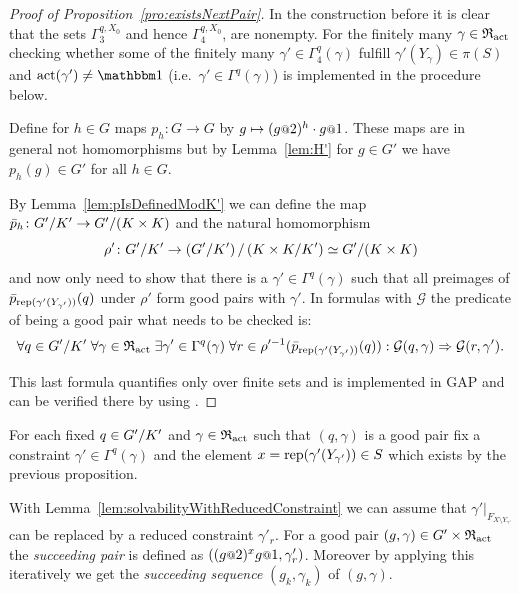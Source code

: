 \documentclass[a4paper,11pt]{amsart}
\begin{document}
\begin{proof}[Proof of Proposition~\ref{pro:existsNextPair}]
 In the construction before it is clear that the sets $\Gamma_3^{q,X_0}$ and hence $\Gamma_4^{q,X_0}$,
 are nonempty. For the finitely many $\gamma\in \mathfrak{R}_{\operatorname{act}}$ checking whether some of the finitely many 
 $\gamma'\in\Gamma_4^{q}(\gamma)$ fulfill 
 $\gamma'(Y_\gamma) \in \pi(S)$ and $\act(\gamma')\neq\id$ 
 (i.e.\ $\gamma' \in\Gamma^{q}(\gamma)$) is implemented in the procedure below.
 
 
  Define for $h\in G$ maps $p_h\colon G\to G$ by 
  $g\mapsto (g\at{2})^{h}\cdot g\at{1}$. These maps are in general not
   homomorphisms but   %
  by Lemma~\ref{lem:H'} for $g\in G'$ we have $p_h(g)\in G'$ for all $h\in G$. 
 
  By Lemma~\ref{lem:pIsDefinedModK'} we can define the map $\bar p_h\colon {G'/K'} \to {G'/(K\times K)}$
 and the natural homomorphism \[\rho'\colon {G'/K'} \to {\left({G'/K'}\right)/\left({K\times K/K'}\right)} \simeq {G'/(K\times K)} \]
 and now only need to show that there is a $\gamma'\in\Gamma^q(\gamma)$ such that all preimages of $\bar p_{\operatorname{rep}(\gamma'(Y_{\gamma'}))}(q)$ under $\rho'$ 
 form good pairs with $\gamma'$. In formulas with $\mathcal{G}$ the predicate of being a good pair what needs to be checked is: 
 \[\forall q\in{G'/K'}\;
      \forall \gamma\in\mathfrak{R}_{\operatorname{act}} \;
	 \exists \gamma'\in \Gamma^q(\gamma)\;
	    \forall r\in \rho'^{-1}(\bar p_{\operatorname{rep}(\gamma'(Y_{\gamma'}))}(q)):
	      \mathcal{G}(q,\gamma) \Rightarrow \mathcal{G}(r,\gamma').\]
 
 This last formula quantifies only over finite sets and is implemented in GAP 
 and can be verified there by using . 
 \end{proof}

 \begin{defi}
 For each fixed $q\in{G'/K'}$ and $\gamma\in \mathfrak{R}_{\operatorname{act}}$ such that $(q,\gamma)$ is a good pair
 fix a constraint $\gamma'\in\Gamma^q(\gamma)$ and the element 
 $x=\operatorname{rep}(\gamma'(Y_{\gamma'}))\in S$ which exists by the previous proposition.
 
 With Lemma~\ref{lem:solvabilityWithReducedConstraint} we can assume that $\gamma'|_{F_{X\setminus Y_{\gamma'}}}$ can be replaced by a reduced constraint $\gamma'_r$. 
 For a good pair $(g,\gamma)\in G'\times\mathfrak{R}_{\operatorname{act}}$ the \emph{succeeding pair} is defined as $\left((g\at{2})^xg\at{1},\gamma'_r\right)$.
 Moreover by applying this iteratively we get the \emph{succeeding sequence} $(g_k,\gamma_k)$ of $(g,\gamma)$.
 \end{defi}
\end{document}
